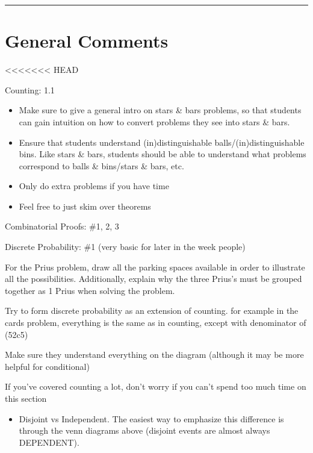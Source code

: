 \documentclass{exam}
\title{}
\date{Berlekamp-Welsh, Countability, Self Reference, Counting}
\begin{document}
\maketitle
\rule{\textwidth}{0.15em}
\fontsize{12}{15}\selectfont
\thispagestyle{empty}


\section{General Comments}
\begin{questions}
<<<<<<< HEAD
\item Counting: 1.1
\begin{itemize}
\item Make sure to give a general intro on stars \& bars problems, so that students can gain intuition on how to convert problems they see into stars \& bars. 
\item Ensure that students understand (in)distinguishable balls/(in)distinguishable bins. Like stars \& bars, students should be able to understand what problems correspond to balls \& bins/stars \& bars, etc.
\item Only do extra problems if you have time
\item Feel free to just skim over theorems
\end{itemize}
\item Combinatorial Proofs: \#1, 2, 3
\item Discrete Probability: \#1 (very basic for later in the week people)
\item For the Prius problem, draw all the parking spaces available in order to illustrate all the possibilities. Additionally, explain why the three Prius's must be grouped together as 1 Prius when solving the problem.
\item Try to form discrete probability as an extension of counting. for example in the cards problem, everything is the same as in counting, except with denominator of (52c5)
\item Make sure they understand everything on the diagram (although it may be more helpful for conditional)
\item If you've covered counting a lot, don't worry if you can't spend too much time on this section
\begin{itemize}
\item Disjoint vs Independent. The easiest way to emphasize this difference is through the venn diagrams above (disjoint events are almost always DEPENDENT).

\end{itemize}
\end{questions}
\end{document}
